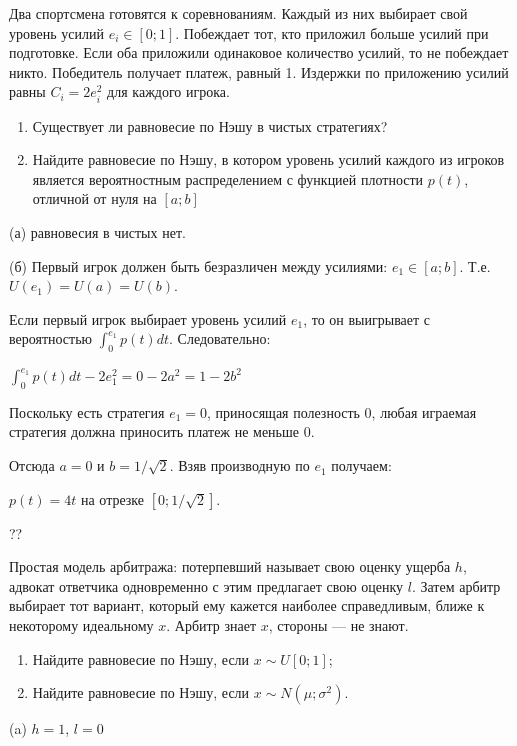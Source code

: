 \begin{problem}

Два спортсмена готовятся к соревнованиям. Каждый из них выбирает
свой уровень усилий $e_{i}\in[0;1]$. Побеждает тот, кто приложил
больше усилий при подготовке. Если оба приложили одинаковое
количество усилий, то не побеждает никто. Победитель получает
платеж, равный 1. Издержки по приложению усилий равны
$C_{i}=2e_{i}^{2}$ для каждого игрока. \par
\begin{enumerate}
\item Существует ли равновесие по Нэшу в чистых стратегиях? \par
\item Найдите равновесие по Нэшу, в котором уровень усилий каждого из
игроков является
вероятностным
распределением с
функцией плотности $p(t)$, отличной от нуля на $[a;b]$
\end{enumerate}


\begin{sol}

(а) равновесия в чистых нет. \par
(б) Первый игрок должен быть безразличен между усилиями:
$e_{1}\in [a;b]$. Т.е. $U(e_{1})=U(a)=U(b)$. \par
Если первый игрок выбирает уровень усилий $e_{1}$, то он
выигрывает с вероятностью $\int_{0}^{e_{1}}p(t)dt$.
Следовательно: \par
$\int_{0}^{e_{1}}p(t)dt-2e_{1}^{2}=0-2a^{2}=1-2b^{2}$ \par
Поскольку есть стратегия $e_{1}=0$, приносящая полезность 0, любая
играемая стратегия должна приносить платеж не меньше 0. \par
Отсюда $a=0$ и $b=1/\sqrt{2}$.
Взяв производную по $e_{1}$ получаем: \par
$p(t)=4t$ на отрезке $[0;1/\sqrt{2}]$.
\end{sol}
\end{problem}


\begin{problem}
\begin{source}
\cite{gibbons:ae}??
\end{source}
Простая модель арбитража: потерпевший называет свою оценку ущерба  $h$, адвокат ответчика одновременно с этим предлагает свою оценку  $l$. Затем арбитр выбирает тот вариант, который ему кажется наиболее справедливым, ближе к некоторому идеальному  $x$. Арбитр знает  $x$, стороны — не знают.\par
\begin{enumerate}
\item Найдите равновесие по Нэшу, если  $x\sim U\left[0;1\right]$;\par
\item Найдите равновесие по Нэшу, если  $x\sim N\left(\mu ;\sigma ^{2} \right).$
\end{enumerate}

\begin{sol}
(a) $h=1$, $l=0$
\end{sol}
\end{problem}

